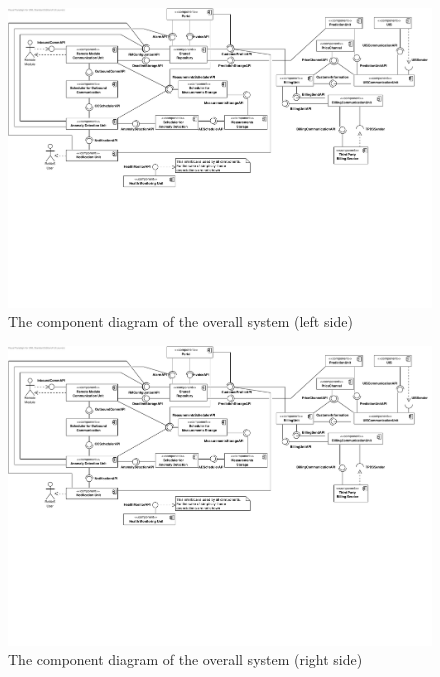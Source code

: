 \begin{figure}[H]
	\begin{centering}
		\includegraphics[width=1.42\textwidth,angle=90]{figs/left-final-component.pdf}
		\caption{The component diagram of the overall system (left side)}
		\label{fig:final-components-left}
	\end{centering}
\end{figure}

\begin{figure}[H]
	\begin{centering}
		\includegraphics[width=1.42\textwidth,angle=90]{figs/right-final-component.pdf}
		\caption{The component diagram of the overall system (right side)}
		\label{fig:final-components-right}
	\end{centering}
\end{figure}


